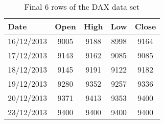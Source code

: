 \begin{table}[ht]
\centering
\caption[Final 6 rows of the DAX data set.]{Final 6 rows of the DAX data set} 
\label{tab:daxtail}
\begin{tabular}{lcccc}
  \toprule Date & Open & High & Low & Close \\ 
  \midrule 16/12/2013 & 9005 & 9188 & 8998 & 9164 \\ 
  17/12/2013 & 9143 & 9162 & 9085 & 9085 \\ 
  18/12/2013 & 9145 & 9191 & 9122 & 9182 \\ 
  19/12/2013 & 9280 & 9352 & 9257 & 9336 \\ 
  20/12/2013 & 9371 & 9413 & 9353 & 9400 \\ 
  23/12/2013 & 9400 & 9400 & 9400 & 9400 \\ 
   \bottomrule \end{tabular}
\end{table}
